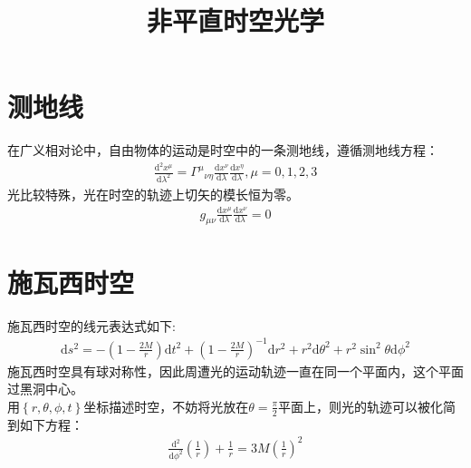 \documentclass[a4paper, 12pt]{article}
\begin{document}
    \title{非平直时空光学}
    \maketitle 
    \section{测地线}
    在广义相对论中，自由物体的运动是时空中的一条测地线，遵循测地线方程：
    \begin{align*}
        \frac{\mathrm d^2 x^{\mu}}{\mathrm d \lambda ^2} = {\Gamma^{\mu}}_{\nu\eta}\frac{\mathrm d x^{\nu}}{\mathrm d \lambda}\frac{\mathrm d x^{\eta}}{\mathrm d \lambda} ,\mu = 0,1,2,3 
    \end{align*}
    光比较特殊，光在时空的轨迹上切矢的模长恒为零。
    \begin{align*}
        g_{\mu\nu}\frac{\mathrm d x^{\mu}}{\mathrm d \lambda}\frac{\mathrm dx^{\nu}}{\mathrm d\lambda} = 0  
    \end{align*}
    \section{施瓦西时空}
    施瓦西时空的线元表达式如下:
    \begin{align*}
        \mathrm ds^2 = -(1-\frac{2M}{r} )\mathrm dt^2 +(1-\frac{2M}{r} )^{-1}\mathrm dr^2 + r^2\mathrm d\theta^2 + r^2\sin^2 \theta \mathrm d\phi ^2
    \end{align*}
    施瓦西时空具有球对称性，因此周遭光的运动轨迹一直在同一个平面内，这个平面过黑洞中心。\\
    用$\left\{r,\theta,\phi,t\right\}$坐标描述时空，不妨将光放在$\theta = \frac{\pi}{2} $平面上，则光的轨迹可以被化简到如下方程：
    \begin{align*}
        \frac{\mathrm d^{2}}{\mathrm d\phi^{2}} (\frac{1}{r}) + \frac{1}{r} = 3M(\frac{1}{r} )^2
    \end{align*}
\end{document}
